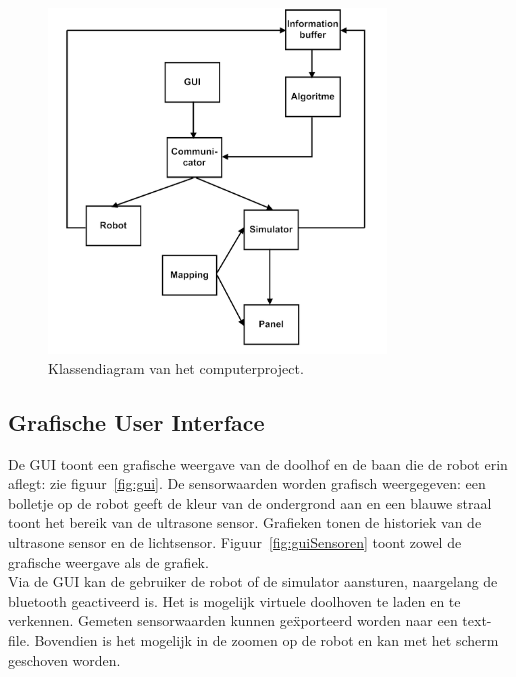 \documentclass[tt3]{penoverslag}
\begin{document}
\begin{figure}[tbp]
\begin{center}
    \includegraphics[width=0.8\textwidth]{Klassendiagram}
    \caption{Klassendiagram van het computerproject.}
    \label{fig:klasDia}
\end{center}
\end{figure}

\subsection{Grafische User Interface} %
\label{ssec:GUI}
De GUI toont een grafische weergave van de doolhof en de baan die de robot erin aflegt: zie figuur~\ref{fig:gui}. De sensorwaarden worden grafisch weergegeven: een bolletje op de robot geeft de kleur van de ondergrond aan en een blauwe straal toont het bereik van de ultrasone sensor. Grafieken tonen de historiek van de ultrasone sensor en de lichtsensor. Figuur~\ref{fig:guiSensoren} toont zowel de grafische weergave als de grafiek. \\

Via de GUI kan de gebruiker de robot of de simulator aansturen, naargelang de bluetooth geactiveerd is. Het is mogelijk virtuele doolhoven te laden en te verkennen. Gemeten sensorwaarden kunnen ge\"xporteerd worden naar een text-file. Bovendien is het mogelijk in de zoomen op de robot en kan met het scherm geschoven worden.
\end{document}
